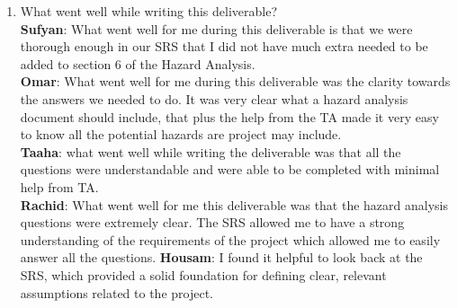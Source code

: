 \documentclass{article}
\begin{document}
\begin{enumerate}
    \item What went well while writing this deliverable? \\ 
    \textbf{Sufyan}: What went well for me during this deliverable is that we were thorough enough in our SRS that I did not have much extra needed to be added to section 6 of the Hazard Analysis. \\
    \textbf{Omar}: What went well for me during this deliverable was the clarity towards the answers we needed to do. It was very clear what a hazard analysis document should include, that plus the help from the TA made it very easy to know all the potential hazards are project may include.  \\
    \textbf{Taaha}: what went well while writing the deliverable was that all the questions were understandable and were able to be completed with minimal help from TA. \\
    \textbf{Rachid}: What went well for me this deliverable was that the hazard analysis questions were extremely clear. The SRS allowed me to have a strong understanding of the requirements of the project which allowed me to easily answer all the questions.
    \textbf{Housam}: I found it helpful to look back at the SRS, which provided a solid foundation for defining clear, relevant assumptions related to the project. \\
   

\end{enumerate}
\end{document}
